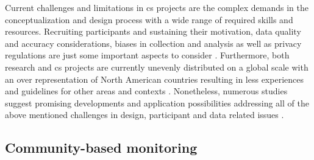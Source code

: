 Current challenges and limitations in \acrshort{cs} projects are the complex demands in the conceptualization and design process with a wide range of required skills and resources. Recruiting participants and sustaining their motivation, data quality and accuracy considerations, biases in collection and analysis as well as privacy regulations are just some important aspects to consider \autocite{fraislCitizenScienceEnvironmental2022}. Furthermore, both research and \acrshort{cs} projects are currently unevenly distributed on a global scale with an over representation of North American countries resulting in less experiences and guidelines for other areas and contexts \autocite{kirschkeCitizenScienceProjects2022, zhengCrowdsourcingMethodsData2018}. Nonetheless, numerous studies suggest promising developments and application possibilities addressing all of the above mentioned challenges in design, participant and data related issues \autocite{buckinghamshumGlobalParticipatoryPlatform2012,buddeParticipatorySensingParticipatory2017,escaECSACharacteristicsCitizen2020,fraislCitizenScienceEnvironmental2022,lowryGrowingPainsCrowdsourced2019,pocockStrategicFrameworkSupport,ruttenHowGetKeep2017,weeserCitizenSciencePioneers2018a}. 

\subsection{Community-based monitoring}\label{subsec:cbm}

